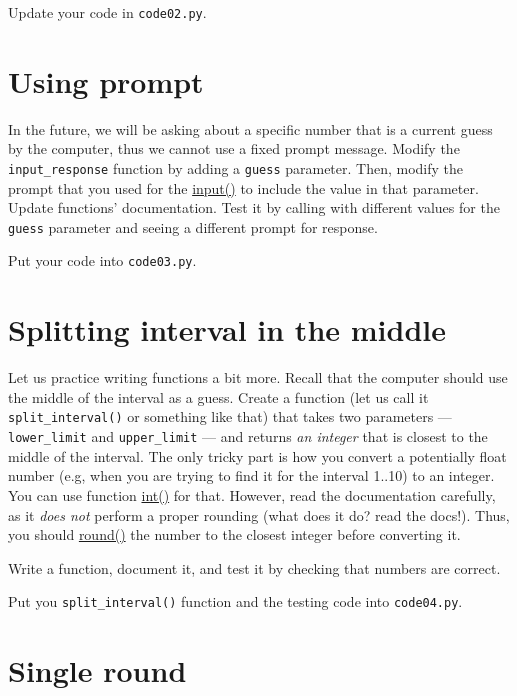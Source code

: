 \documentclass[
]{book}
\begin{document}
Update your code in \texttt{code02.py}.

\hypertarget{using-prompt}{%
\section{Using prompt}\label{using-prompt}}

In the future, we will be asking about a specific number that is a current guess by the computer, thus we cannot use a fixed prompt message. Modify the \texttt{input\_response} function by adding a \texttt{guess} parameter. Then, modify the prompt that you used for the \href{https://docs.python.org/3/library/functions.html\#input}{input()} to include the value in that parameter. Update functions' documentation. Test it by calling with different values for the \texttt{guess} parameter and seeing a different prompt for response.

Put your code into \texttt{code03.py}.

\hypertarget{splitting-interval-in-the-middle}{%
\section{Splitting interval in the middle}\label{splitting-interval-in-the-middle}}

Let us practice writing functions a bit more. Recall that the computer should use the middle of the interval as a guess. Create a function (let us call it \texttt{split\_interval()} or something like that) that takes two parameters --- \texttt{lower\_limit} and \texttt{upper\_limit} --- and returns \emph{an integer} that is closest to the middle of the interval. The only tricky part is how you convert a potentially float number (e.g, when you are trying to find it for the interval 1..10) to an integer. You can use function \href{https://docs.python.org/3/library/functions.html\#int}{int()} for that. However, read the documentation carefully, as it \emph{does not} perform a proper rounding (what does it do? read the docs!). Thus, you should \href{https://docs.python.org/3/library/functions.html\#round}{round()} the number to the closest integer before converting it.

Write a function, document it, and test it by checking that numbers are correct.

Put you \texttt{split\_interval()} function and the testing code into \texttt{code04.py}.

\hypertarget{single-round}{%
\section{Single round}\label{single-round}}
\end{document}
